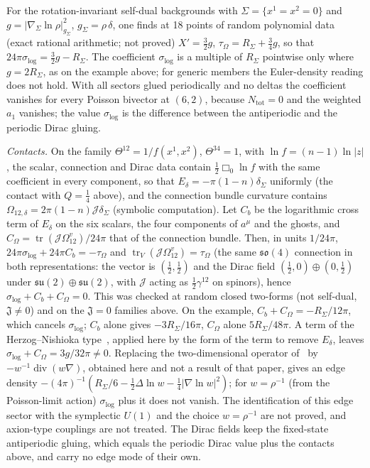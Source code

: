 For the rotation-invariant self-dual backgrounds with \(\Sigma=\{x^1=x^2=0\}\) and \(g=|\nabla_\Sigma\ln\rho|^2_{g_\Sigma}\), \(g_\Sigma=\rho\,\delta\), one finds at 18 points of random polynomial data (exact rational arithmetic; not proved) \(X'=\tfrac32g\), \(\tau_\Omega=R_\Sigma+\tfrac34g\), so that \(24\pi\sigma_{\log}=\tfrac32g-R_\Sigma\). The coefficient \(\sigma_{\log}\) is a multiple of \(R_\Sigma\) pointwise only where \(g=2R_\Sigma\), as on the example above; for generic members the Euler-density reading does not hold. With all sectors glued periodically and no deltas the coefficient vanishes for every Poisson bivector at \((6,2)\), because \(N_{\mathrm{tot}}=0\) and the weighted \(a_1\) vanishes; the value \(\sigma_{\log}\) is the difference between the antiperiodic and the periodic Dirac gluing.



\emph{Contacts.} On the family \(\Theta^{12}=1/f(x^1,x^2)\), \(\Theta^{34}=1\), with \(\ln f=(n-1)\ln|z|\), the scalar, connection and Dirac data contain \(\tfrac12\Box_0\ln f\) with the same coefficient in every component, so that \(E_\delta=-\pi(1-n)\delta_\Sigma\) uniformly (the contact with \(Q=\tfrac14\) above), and the connection bundle curvature contains \(\Omega_{12,\delta}=2\pi(1-n)\mathcal J\delta_\Sigma\) (symbolic computation). Let \(C_b\) be the logarithmic cross term of \(E_\delta\) on the six scalars, the four components of \(a^\mu\) and the ghosts, and \(C_\Omega=\operatorname{tr}(\mathcal J\Omega^{v}_{12})/24\pi\) that of the connection bundle. Then, in units \(1/24\pi\), \(24\pi\sigma_{\log}+24\pi C_b=-\tau_\Omega\) and \(\operatorname{tr}_V(\mathcal J\Omega^v_{12})=\tau_\Omega\) (the same \(\mathfrak{so}(4)\) connection in both representations: the vector is \((\tfrac12,\tfrac12)\) and the Dirac field \((\tfrac12,0)\oplus(0,\tfrac12)\) under \(\mathfrak{su}(2)\oplus\mathfrak{su}(2)\), with \(\mathcal J\) acting as \(\tfrac12\gamma^{12}\) on spinors), hence \(\sigma_{\log}+C_b+C_\Omega=0\). This was checked at random closed two-forms (not self-dual, \(\mathfrak J\neq0\)) and on the \(\mathfrak J=0\) families above. On the example, \(C_b+C_\Omega=-R_\Sigma/12\pi\), which cancels \(\sigma_{\log}\); \(C_b\) alone gives \(-3R_\Sigma/16\pi\), \(C_\Omega\) alone \(5R_\Sigma/48\pi\). A term of the Herzog--Nishioka type~\cite{HerzogNishioka2016}, applied here by the form of the term to remove \(E_\delta\), leaves \(\sigma_{\log}+C_\Omega=3g/32\pi\ne0\). Replacing the two-dimensional operator of~\cite{DonnellyWall2016} by \(-w^{-1}\operatorname{div}(w\nabla)\), obtained here and not a result of that paper, gives an edge density \(-(4\pi)^{-1}(R_\Sigma/6-\tfrac12\Delta\ln w-\tfrac14|\nabla\ln w|^2)\); for \(w=\rho^{-1}\) (from the Poisson-limit action) \(\sigma_{\log}\) plus it does not vanish. The identification of this edge sector with the symplectic \(U(1)\) and the choice \(w=\rho^{-1}\) are not proved, and axion-type couplings are not treated. The Dirac fields keep the fixed-state antiperiodic gluing, which equals the periodic Dirac value plus the contacts above, and carry no edge mode of their own.



